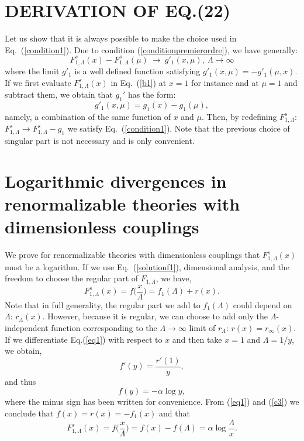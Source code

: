 \documentclass[floatfix,twocolumn,preprintnumbers,amsmath,amssymb,prb]{revtex4}
\begin{document}
{{\section{DERIVATION OF EQ.(22)}
Let us show that it is always possible to make the choice used in
Eq.~(\ref{condition1}). Due to condition
(\ref{conditionpremierordre}), we have generally:
\begin{equation}
F_{1,\Lambda}^{s}(x)-F_{1,\Lambda}^{s}(\mu)\ \to\ g'_1(x,\mu),\
\Lambda\to\infty
\label{b1}
\end{equation}
where the limit $g'_1$ is a well defined function satisfying
$g'_1(x,\mu)=-g'_1(\mu,x)$. If we first evaluate 
$F_{1,\Lambda}^{s}(x)$ in Eq.~(\ref{b1}) at
$x=1$ for instance and at $\mu=1$ and subtract them, we
obtain that $g_1'$ has the form:
\begin{equation}
g'_1(x,\mu)=g_1(x)-g_1(\mu),
\end{equation}
namely, a combination of the same function of $x$ and $\mu$. Then,
by redefining $F_{1,\Lambda}^{s}$: $F_{1,\Lambda}^{s}\to
F_{1,\Lambda}^{s}-g_1$ we satisfy Eq.~(\ref{condition1}). Note
that the previous choice of singular part is not necessary and is
only convenient. 

\section{Logarithmic divergences in renormalizable theories with dimensionless couplings}
We prove  for renormalizable theories with dimensionless
couplings that $F_{1,\Lambda}^s(x)$ must be a logarithm. If we use
Eq.~(\ref{solutionf1}), dimensional analysis, and the freedom to
choose the regular part of 
$F_{1,\Lambda}$, we have,
\begin{equation}
F_{1,\Lambda}^s(x)=f\big(\frac{x}{\Lambda}\big)=f_1(\Lambda) +
r(x).
\label{eq1}
\end{equation}
Note that in full generality, the regular part we add to
$f_1(\Lambda)$ could depend on $\Lambda$: $r_\Lambda(x)$. However,
because it is regular, we can choose to add only the
$\Lambda$-independent function corresponding to the
$\Lambda\to\infty$ limit of $r_\Lambda$: $r(x)=r_\infty(x)$. If
we differentiate Eq.(\ref{eq1}) with respect to $x$ and then take
$x=1$ and
$\Lambda=1/y$, we obtain,
\begin{equation}
f'(y)=\frac{r'(1)}{y},
\end{equation}
and thus
\begin{equation}
f(y)= -\alpha \log y,
\label{c3}
\end{equation}
where the minus sign has been written for convenience. From
(\ref{eq1}) and (\ref{c3}) we conclude that
$f(x)=r(x)=-f_1(x)$ and that
\begin{equation}
F_{1,\Lambda}^s(x)=f\big(\frac{x}{\Lambda}\big)=
f(x)-f(\Lambda)=\alpha
\log\frac{\Lambda}{x}.
\label{eq2}
\end{equation}

}}
\end{document}
